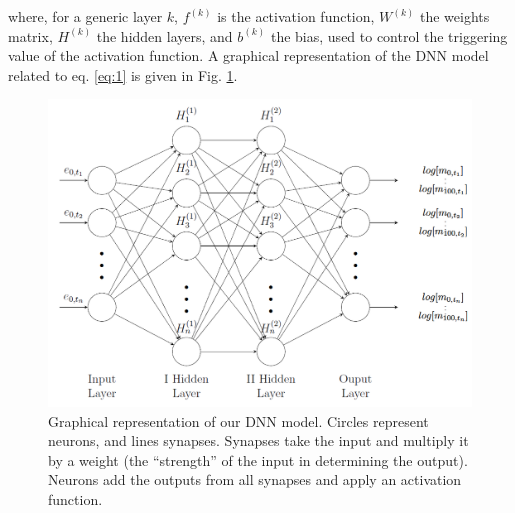 \documentclass[a4,11pt]{article}
\begin{document}
where, for a generic layer $k$, $f^{(k)}$ is the activation function, $W^{(k)}$ the weights matrix, $H^{(k)}$ the hidden layers, and $b^{(k)}$ the bias, used to control the triggering value of the activation function.
A graphical representation of the DNN model related to eq. \ref{eq:1} is given in Fig. \ref{fig:NN}.
\begin{figure}[H]
\centering
\includegraphics[width=0.8\linewidth]{NNmodel.png}
\caption{\footnotesize Graphical representation of our DNN model. Circles represent neurons, and lines synapses. Synapses take the input and multiply it by a weight (the “strength” of the input in determining the output). Neurons add the outputs from all synapses and apply an activation function.}
\label{fig:NN}
\end{figure}
\end{document}
